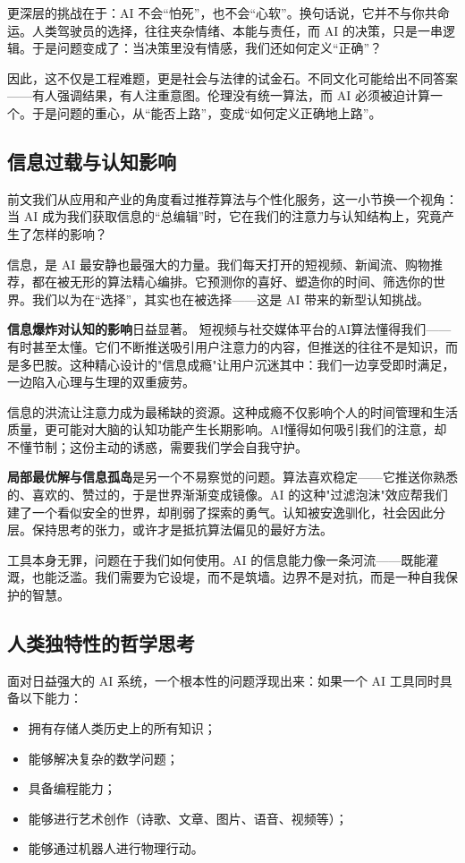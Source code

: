 更深层的挑战在于：AI 不会“怕死”，也不会“心软”。换句话说，它并不与你共命运。人类驾驶员的选择，往往夹杂情绪、本能与责任，而 AI 的决策，只是一串逻辑。于是问题变成了：当决策里没有情感，我们还如何定义“正确”？

因此，这不仅是工程难题，更是社会与法律的试金石。不同文化可能给出不同答案——有人强调结果，有人注重意图。伦理没有统一算法，而 AI 必须被迫计算一个。于是问题的重心，从“能否上路”，变成“如何定义正确地上路”。

\subsection{信息过载与认知影响}
前文我们从应用和产业的角度看过推荐算法与个性化服务，这一小节换一个视角：当 AI 成为我们获取信息的“总编辑”时，它在我们的注意力与认知结构上，究竟产生了怎样的影响？

信息，是 AI 最安静也最强大的力量。我们每天打开的短视频、新闻流、购物推荐，都在被无形的算法精心编排。它预测你的喜好、塑造你的时间、筛选你的世界。我们以为在“选择”，其实也在被选择——这是 AI 带来的新型认知挑战。

{\bf 信息爆炸对认知的影响}日益显著。
短视频与社交媒体平台的AI算法懂得我们——有时甚至太懂。它们不断推送吸引用户注意力的内容，但推送的往往不是知识，而是多巴胺。这种精心设计的"信息成瘾"让用户沉迷其中：我们一边享受即时满足，一边陷入心理与生理的双重疲劳。

信息的洪流让注意力成为最稀缺的资源。这种成瘾不仅影响个人的时间管理和生活质量，更可能对大脑的认知功能产生长期影响。AI懂得如何吸引我们的注意，却不懂节制；这份主动的诱惑，需要我们学会自我守护。

{\bf 局部最优解与信息孤岛}是另一个不易察觉的问题。算法喜欢稳定——它推送你熟悉的、喜欢的、赞过的，于是世界渐渐变成镜像。AI 的这种"过滤泡沫"效应帮我们建了一个看似安全的世界，却削弱了探索的勇气。认知被安逸驯化，社会因此分层。保持思考的张力，或许才是抵抗算法偏见的最好方法。

工具本身无罪，问题在于我们如何使用。AI 的信息能力像一条河流——既能灌溉，也能泛滥。我们需要为它设堤，而不是筑墙。边界不是对抗，而是一种自我保护的智慧。

\subsection{人类独特性的哲学思考}

面对日益强大的 AI 系统，一个根本性的问题浮现出来：如果一个 AI 工具同时具备以下能力：

\begin{itemize}
\item 拥有存储人类历史上的所有知识；
\item 能够解决复杂的数学问题；
\item 具备编程能力；
\item 能够进行艺术创作（诗歌、文章、图片、语音、视频等）；
\item 能够通过机器人进行物理行动。
\end{itemize}

